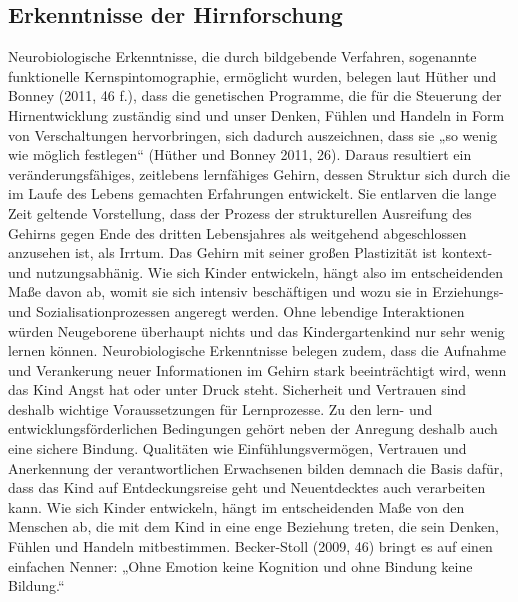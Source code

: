 \subsection{Erkenntnisse der Hirnforschung}
Neurobiologische Erkenntnisse, die durch bildgebende Verfahren, sogenannte funktionelle Kernspintomographie, ermöglicht wurden,
belegen laut Hüther und Bonney (2011, 46 f.), dass die genetischen Programme, die für die Steuerung der Hirnentwicklung zuständig sind und unser Denken, Fühlen und Handeln in Form von Verschaltungen hervorbringen, sich dadurch auszeichnen, dass sie „so wenig wie möglich festlegen“ (Hüther und Bonney 2011, 26). Daraus resultiert ein veränderungsfähiges, zeitlebens lernfähiges Gehirn, dessen Struktur sich durch die im Laufe des Lebens gemachten Erfahrungen entwickelt. Sie entlarven die lange Zeit geltende Vorstellung, dass der Prozess der strukturellen Ausreifung des Gehirns gegen Ende des dritten Lebensjahres als weitgehend abgeschlossen anzusehen ist, als Irrtum. Das Gehirn mit seiner großen Plastizität ist kontext- und nutzungsabhänig. Wie sich Kinder entwickeln, hängt also im entscheidenden Maße davon ab, womit sie sich intensiv beschäftigen und wozu sie in Erziehungs- und Sozialisationprozessen angeregt werden. Ohne lebendige Interaktionen würden Neugeborene überhaupt nichts und das Kindergartenkind nur sehr wenig lernen können. Neurobiologische Erkenntnisse belegen zudem, dass die Aufnahme und Verankerung neuer Informationen im Gehirn stark beeinträchtigt wird, wenn das Kind Angst hat oder unter Druck steht. Sicherheit und Vertrauen sind deshalb wichtige Voraussetzungen für Lernprozesse. Zu den lern- und entwicklungsförderlichen Bedingungen gehört neben der Anregung deshalb 
auch eine sichere Bindung. Qualitäten wie Einfühlungsvermögen, Vertrauen und Anerkennung der verantwortlichen Erwachsenen bilden demnach die Basis dafür, dass das Kind auf Entdeckungsreise geht und Neuentdecktes auch verarbeiten kann. Wie sich Kinder entwickeln, hängt im entscheidenden Maße von den Menschen ab, die mit dem Kind in eine enge Beziehung treten, die sein Denken, Fühlen und Handeln mitbestimmen.
Becker-Stoll (2009, 46) bringt es auf einen einfachen Nenner: „Ohne Emotion keine Kognition und ohne Bindung keine Bildung.“ 

